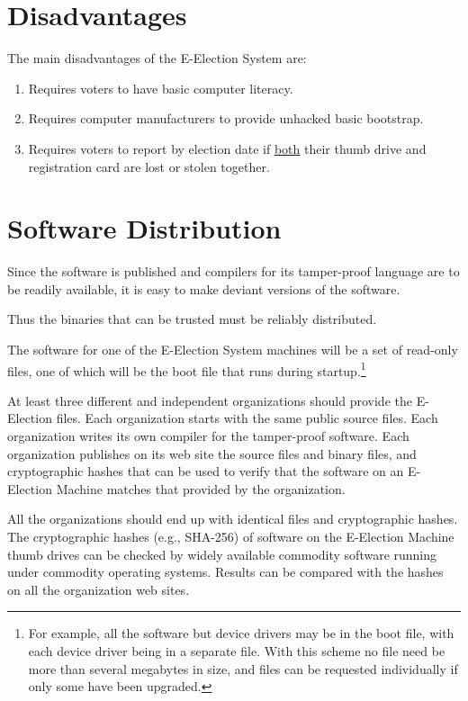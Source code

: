 \documentclass[12pt]{article}
\begin{document}
\section{Disadvantages}

The main disadvantages of the E-Election System are:
\begin{enumerate}
\item Requires voters to have basic computer literacy.
\item Requires computer manufacturers to provide unhacked basic
      bootstrap.
\item Requires voters to report by election date
      if \underline{both} their
      thumb drive and registration card are lost or stolen
      together.
\end{enumerate}

\section{Software Distribution}\label{SOFTWARE-DISTRIBUTION}

Since the software is published and compilers for its tamper-proof
language are to be readily available, it is easy to make deviant
versions of the software.\label{DEVIANT-SOFTWARE}

Thus the binaries that can be trusted must be reliably distributed.

The software for one of the E-Election
System machines will be a set of read-only files, one of which will be
the boot file that runs during startup.\footnote{For example, all
the software but device drivers may be in the boot file, with each
device driver being in a separate file.  With this scheme no file
need be more than several megabytes in size, and files can be
requested individually if only some have been upgraded.}

At least three different and independent organizations should provide
the E-Election files.  Each organization starts with the same public
source files.  Each organization writes its own compiler for the
tamper-proof software.  Each organization publishes on its web site
the source files and binary files, and cryptographic hashes that
can be used to verify that the software on an E-Election Machine
matches that provided by the organization.

All the organizations should end up with identical files and
cryptographic hashes.  The cryptographic hashes (e.g., SHA-256)
of software on the E-Election Machine thumb drives can be checked
by widely available commodity software running under commodity
operating systems.  Results can be compared with the hashes on
all the organization web sites.
\end{document}
